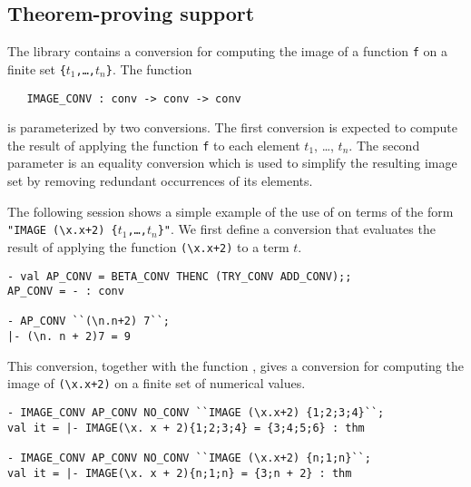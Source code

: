 \subsection{Theorem-proving support}

The%
 library contains
a conversion for computing the image of a function {\small\verb!f!} on a finite
set {\small\verb!{!\tt$t_1$,\dots,$t_n$\verb!}!}.  The function

\begin{hol}
\begin{verbatim}
   IMAGE_CONV : conv -> conv -> conv
\end{verbatim}\end{hol}

\noindent is parameterized by two conversions.  The first conversion is
expected to compute the result of applying the function {\small\verb!f!} to
each element {\small$t_1$}, \dots, {\small $t_n$}.  The second parameter is an
equality conversion which is used to simplify the resulting image set by
removing redundant occurrences of its elements.

The following session shows a simple example of the use of  on
terms of the form
{\small\tt\verb!"IMAGE (\x.x+2) {!$t_1$,\dots,$t_n$\verb!}"!}.
We first define a conversion that evaluates the
result of applying the function {\small\verb!(\x.x+2)!} to a term {\small$t$}.

\setcounter{sessioncount}{1}
\begin{session}
\begin{verbatim}
- val AP_CONV = BETA_CONV THENC (TRY_CONV ADD_CONV);;
AP_CONV = - : conv

- AP_CONV ``(\n.n+2) 7``;
|- (\n. n + 2)7 = 9
\end{verbatim}\end{session}

\noindent This conversion, together with the function , gives a
conversion for computing the image of {\small\verb!(\x.x+2)!} on a finite set
of numerical values.

\begin{session}
\begin{verbatim}
- IMAGE_CONV AP_CONV NO_CONV ``IMAGE (\x.x+2) {1;2;3;4}``;
val it = |- IMAGE(\x. x + 2){1;2;3;4} = {3;4;5;6} : thm

- IMAGE_CONV AP_CONV NO_CONV ``IMAGE (\x.x+2) {n;1;n}``;
val it = |- IMAGE(\x. x + 2){n;1;n} = {3;n + 2} : thm
\end{verbatim}\end{session}


